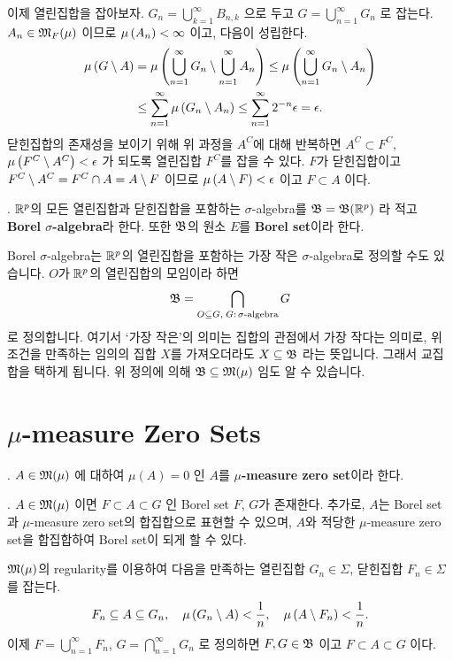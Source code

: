이제 열린집합을 잡아보자. \(G_n = \bigcup_{k=1}^{\infty} B_{n, k}\) 으로 두고 \(G = \bigcup_{n=1}^{\infty} G_n\) 로 잡는다. \(A_n \in \mathfrak{M}_F(\mu)\) 이므로 \(\mu\left( A_n \right) < \infty\) 이고, 다음이 성립한다.
\[
    \begin{aligned}
        \mu\left( G \setminus A \right) & = \mu\left( \bigcup_{n=1}^{\infty} G_n \setminus \bigcup_{n=1}^{\infty} A_n \right) \leq \mu\left( \bigcup_{n=1}^{\infty} G_n \setminus A_n \right) \\ &\leq \sum_{n=1}^{\infty} \mu\left( G_n \setminus A_n \right) \leq \sum_{n=1}^{\infty} 2^{-n}\epsilon = \epsilon.
    \end{aligned}
\]
닫힌집합의 존재성을 보이기 위해 위 과정을 \(A^C\)에 대해 반복하면 \(A^C \subset F^C\), \(\mu\left( F^C \setminus A^C \right) < \epsilon\) 가 되도록 열린집합 \(F^C\)를 잡을 수 있다. \(F\)가 닫힌집합이고 \(F^C \setminus A^C = F^C \cap A = A\setminus F\) 이므로 \(\mu\left( A \setminus F \right) < \epsilon\) 이고 \(F\subset A\) 이다.

.  \(\mathbb{R}^p\)의 모든 열린집합과 닫힌집합을 포함하는 \(\sigma\)-algebra를 \(\mathfrak{B} = \mathfrak{B}(\mathbb{R}^p)\) 라 적고 \textbf{Borel \(\sigma\)-algebra}라 한다. 또한 \(\mathfrak{B}\)의 원소 \(E\)를 \textbf{Borel set}이라 한다.

Borel \(\sigma\)-algebra는 \(\mathbb{R}^p\)의 열린집합을 포함하는 가장 작은 \(\sigma\)-algebra로 정의할 수도 있습니다. \(O\)가 \(\mathbb{R}^p\)의 열린집합의 모임이라 하면
\[
    \mathfrak{B} = \bigcap_{O \subseteq G,\;G:\, \sigma\text{-algebra}} G
\]
로 정의합니다. 여기서 `가장 작은'의 의미는 집합의 관점에서 가장 작다는 의미로, 위 조건을 만족하는 임의의 집합 \(X\)를 가져오더라도 \(X \subseteq \mathfrak{B}\) 라는 뜻입니다. 그래서 교집합을 택하게 됩니다. 위 정의에 의해 \(\mathfrak{B} \subseteq \mathfrak{M}(\mu)\) 임도 알 수 있습니다.

\section*{\(\mu\)-measure Zero Sets}

.  \(A \in \mathfrak{M}(\mu)\) 에 대하여 \(\mu(A) = 0\) 인 \(A\)를 \textbf{\(\mu\)-measure zero set}이라 한다.

\prop. \(A \in \mathfrak{M}(\mu)\) 이면 \(F \subset A \subset G\) 인 Borel set \(F\), \(G\)가 존재한다. 추가로, \(A\)는 Borel set과 \(\mu\)-measure zero set의 합집합으로 표현할 수 있으며, \(A\)와 적당한 \(\mu\)-measure zero set을 합집합하여 Borel set이 되게 할 수 있다.

\pf \(\mathfrak{M}(\mu)\)의 regularity를 이용하여 다음을 만족하는 열린집합 \(G_n \in \Sigma\), 닫힌집합 \(F_n \in \Sigma\) 를 잡는다.
\[
    F_n \subseteq A \subseteq G_n, \quad \mu\left( G_n \setminus A \right) < \frac{1}{n}, \quad \mu\left( A \setminus F_n \right) < \frac{1}{n}.
\]
이제 \(F = \bigcup_{n=1}^{\infty} F_n\), \(G = \bigcap_{n=1}^{\infty} G_n\) 로 정의하면 \(F, G \in \mathfrak{B}\) 이고 \(F \subset A \subset G\) 이다.

